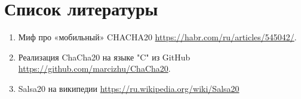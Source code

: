 \documentclass[12pt]{article}
\begin{document}
    \newpage


    \section{Список литературы}

    \begin{enumerate}
        \item Миф про «мобильный» CHACHA20 \url{https://habr.com/ru/articles/545042/}.

        \item Реализация ChaCha20 на языке "C" из GitHub \url{https://github.com/marcizhu/ChaCha20}.

        \item Salsa20 на википедии \url{https://ru.wikipedia.org/wiki/Salsa20}

    \end{enumerate}
\end{document}
